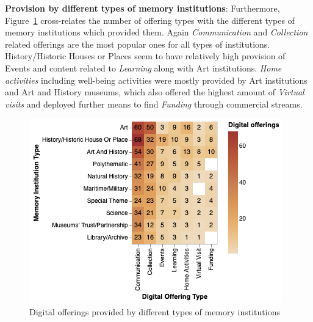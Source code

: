 \documentclass{egpubl}
\begin{document}




\noindent \textbf{Provision by different types of memory institutions}: Furthermore, Figure~\ref{fig:MTypeOfferings} cross-relates the number of offering types with the different types of memory institutions which provided them. Again \textit{Communication} and \textit{Collection} related offerings are the most popular ones for all types of institutions. History/Historic Houses or Places seem to have relatively high provision of Events and content related to \textit{Learning} along with Art institutions. \textit{Home activities} including well-being activities were mostly provided by Art institutions and Art and History museums, which also offered the highest amount of \textit{Virtual visits} and deployed further means to find \textit{Funding} through commercial streams.

\begin{figure}[h]
  \centering
  \includegraphics[width=\linewidth]{images/museumoffering.png}
  \caption{\label{fig:MTypeOfferings}
           Digital offerings provided by different types of memory institutions}
\end{figure}




\end{document}
